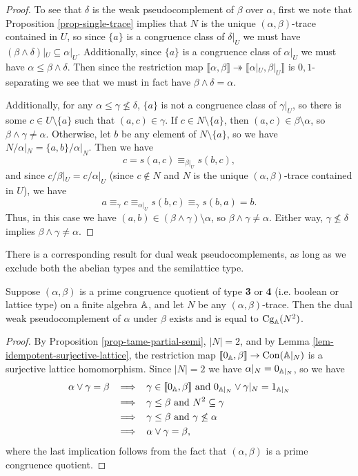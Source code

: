 \begin{appendices}
\begin{proof}
To see that $\delta$ is the weak pseudocomplement of $\beta$ over $\alpha$, first we note that Proposition \ref{prop-single-trace} implies that $N$ is the unique $(\alpha,\beta)$-trace contained in $U$, so since $\{a\}$ is a congruence class of $\delta|_U$ we must have $(\beta \wedge \delta)|_U \subseteq \alpha|_U$. Additionally, since $\{a\}$ is a congruence class of $\alpha|_U$ we must have $\alpha \le \beta \wedge \delta$. Then since the restriction map $\llbracket \alpha, \beta \rrbracket \twoheadrightarrow \llbracket \alpha|_U, \beta|_U \rrbracket$ is $0,1$-separating we see that we must in fact have $\beta \wedge \delta = \alpha$.

Additionally, for any $\alpha \le \gamma \not\le \delta$, $\{a\}$ is not a congruence class of $\gamma|_U$, so there is some $c \in U \setminus \{a\}$ such that $(a,c) \in \gamma$. If $c \in N \setminus \{a\}$, then $(a,c) \in \beta \setminus \alpha$, so $\beta \wedge \gamma \ne \alpha$. Otherwise, let $b$ be any element of $N \setminus \{a\}$, so we have $N/\alpha|_N = \{a,b\}/\alpha|_N$. Then we have
\[
c = s(a,c) \equiv_{\beta|_U} s(b,c),
\]
and since $c/\beta|_U = c/\alpha|_U$ (since $c \not\in N$ and $N$ is the unique $(\alpha,\beta)$-trace contained in $U$), we have
\[
a \equiv_\gamma c \equiv_{\alpha|_U} s(b,c) \equiv_\gamma s(b,a) = b.
\]
Thus, in this case we have $(a,b) \in (\beta \wedge \gamma) \setminus \alpha$, so $\beta \wedge \gamma \ne \alpha$. Either way, $\gamma \not\le \delta$ implies $\beta \wedge \gamma \ne \alpha$.
\end{proof}

There is a corresponding result for dual weak pseudocomplements, as long as we exclude both the abelian types and the semilattice type.

\begin{prop}\label{prop-dual-weak-pseudo} Suppose $(\alpha,\beta)$ is a prime congruence quotient of type \textbf{3} or \textbf{4} (i.e. boolean or lattice type) on a finite algebra $\mathbb{A}$, and let $N$ be any $(\alpha,\beta)$-trace. Then the dual weak pseudocomplement of $\alpha$ under $\beta$ exists and is equal to $\operatorname{Cg}_{\mathbb{A}}(N^2)$.
\end{prop}
\begin{proof} By Proposition \ref{prop-tame-partial-semi}, $|N| = 2$, and by Lemma \ref{lem-idempotent-surjective-lattice}, the restriction map $\llbracket 0_{\mathbb{A}}, \beta \rrbracket \rightarrow \operatorname{Con}(\mathbb{A}|_N)$ is a surjective lattice homomorphism. Since $|N| = 2$ we have $\alpha|_N = 0_{\mathbb{A}|_N}$, so we have
\begin{align*}
\alpha \vee \gamma = \beta \;\; &\implies \;\; \gamma \in \llbracket 0_{\mathbb{A}}, \beta \rrbracket \text{ and } 0_{\mathbb{A}|_N} \vee \gamma|_N = 1_{\mathbb{A}|_N}\\
&\implies \;\; \gamma \le \beta \text{ and } N^2 \subseteq \gamma\\
&\implies \;\; \gamma \le \beta \text{ and } \gamma \not\le \alpha\\
&\implies \;\; \alpha \vee \gamma = \beta,
\end{align*}
where the last implication follows from the fact that $(\alpha,\beta)$ is a prime congruence quotient.
\end{proof}


\end{appendices}
